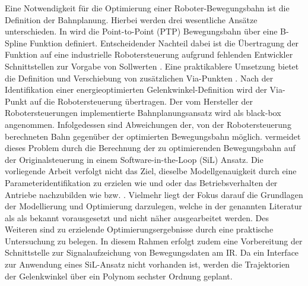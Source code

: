 Eine Notwendigkeit für die Optimierung einer Roboter-Bewegungsbahn ist die Definition der Bahnplanung. Hierbei werden drei wesentliche Ansätze unterschieden. In \cite{Hansen.2012} wird die Point-to-Point (PTP) Bewegungsbahn über eine B-Spline Funktion definiert. Entscheidender Nachteil dabei ist die Übertragung der Funktion auf eine industrielle Robotersteuerung aufgrund fehlenden Entwickler Schnittstellen zur Vorgabe von Sollwerten \cite[S.~55~f.]{Eggers.2019}. Eine praktikablere Umsetzung bietet die Definition und Verschiebung von zusätzlichen Via-Punkten \cite[S.~261~ff.]{Spong.2020}. Nach der Identifikation einer energieoptimierten Gelenkwinkel-Definition wird der Via-Punkt auf die Robotersteuerung übertragen. Der vom Hersteller der Robotersteuerungen implementierte Bahnplanungsansatz wird als black-box angenommen. Infolgedessen sind Abweichungen der, von der Robotersteuerung berechneten Bahn gegenüber der optimierten Bewegungsbahn möglich. \cite{Eggers.2019} vermeidet dieses Problem durch die Berechnung der zu optimierenden Bewegungsbahn auf der Originalsteuerung in einem Software-in-the-Loop (SiL) Ansatz. 
%
Die vorliegende Arbeit verfolgt nicht das Ziel, dieselbe Modellgenauigkeit durch eine Parameteridentifikation zu erzielen wie \cite{Pellicciari.2011} und \cite{Gattringer.2013} oder das Betriebsverhalten der Antriebe nachzubilden wie \cite{Eggers.2019} bzw. \cite{Ziaukas.2017}. Vielmehr liegt der Fokus darauf die Grundlagen der Modellierung und Optimierung darzulegen, welche in der genannten Literatur als als bekannt vorausgesetzt und nicht näher ausgearbeitet werden. 
Des Weiteren sind zu erzielende Optimierungsergebnisse durch eine praktische Untersuchung zu belegen. In diesem Rahmen erfolgt zudem eine Vorbereitung der Schnittstelle zur Signalaufzeichung von Bewegungsdaten am IR. Da ein Interface zur Anwendung eines SiL-Ansatz nicht vorhanden ist, werden die Trajektorien der Gelenkwinkel über ein Polynom sechster Ordnung geplant. 